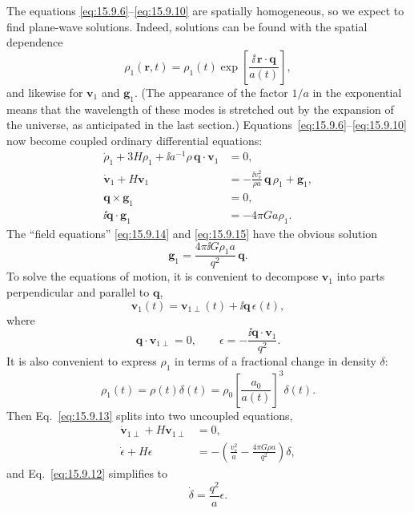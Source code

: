 The equations \eqref{eq:15.9.6}--\eqref{eq:15.9.10} are spatially
homogeneous, so we expect to find plane-wave solutions. Indeed, solutions can
be found with the spatial dependence
\begin{equation}
  \rho_1(\mathbf r,t)
  =
  \rho_1(t)
  \exp\left[
    \frac{\ii\,\mathbf r\cdot\mathbf q}{a(t)}
  \right],
  \tag{15.9.11}\label{eq:15.9.11}
\end{equation}
and likewise for \(\mathbf v_1\) and \(\mathbf g_1\). (The appearance of
the factor \(1/a\) in the exponential means that the wavelength of these
modes is stretched out by the expansion of the universe, as anticipated in
the last section.) Equations~\eqref{eq:15.9.6}--\eqref{eq:15.9.10} now
become coupled ordinary differential equations:
\begin{align}
  \dot\rho_1+3H\rho_1
  +\ii a^{-1}\rho\,\mathbf q\cdot\mathbf v_1
  &=0,
  \tag{15.9.12}\label{eq:15.9.12}\\
  \dot{\mathbf v}_1+H\mathbf v_1
  &=
  -\frac{\ii v_s^2}{\rho a}\,\mathbf q\,\rho_1+\mathbf g_1,
  \tag{15.9.13}\label{eq:15.9.13}\\
  \mathbf q\times\mathbf g_1
  &=0,
  \tag{15.9.14}\label{eq:15.9.14}\\
  \ii\mathbf q\cdot\mathbf g_1
  &=-4\pi G a\rho_1.
  \tag{15.9.15}\label{eq:15.9.15}
\end{align}
The ``field equations'' \eqref{eq:15.9.14} and \eqref{eq:15.9.15} have
the obvious solution
\begin{equation}
  \mathbf g_1
  =
  \frac{4\pi\ii G\rho_1a}{q^2}\,\mathbf q.
  \tag{15.9.16}\label{eq:15.9.16}
\end{equation}
To solve the equations of motion, it is convenient to decompose
\(\mathbf v_1\) into parts perpendicular and parallel to \(\mathbf q\),
\begin{equation}
  \mathbf v_1(t)
  =
  \mathbf v_{1\perp}(t)+\ii\mathbf q\,\epsilon(t),
  \tag{15.9.17}\label{eq:15.9.17}
\end{equation}
where
\[
  \mathbf q\cdot\mathbf v_{1\perp}=0,
  \qquad
  \epsilon=-\frac{\ii\mathbf q\cdot\mathbf v_1}{q^2}.
\]
It is also convenient to express \(\rho_1\) in terms of a fractional change
in density \(\delta\):
\begin{equation}
  \rho_1(t)
  =
  \rho(t)\delta(t)
  =
  \rho_0\left[\frac{a_0}{a(t)}\right]^3\delta(t).
  \tag{15.9.18}\label{eq:15.9.18}
\end{equation}
Then Eq.~\eqref{eq:15.9.13} splits into two uncoupled equations,
\begin{align}
  \dot{\mathbf v}_{1\perp}+H\mathbf v_{1\perp}
  &=0,
  \tag{15.9.19}\label{eq:15.9.19}\\
  \dot\epsilon+H\epsilon
  &=
  -\left(
    \frac{v_s^2}{a}
    -\frac{4\pi G\rho a}{q^2}
  \right)\delta,
  \tag{15.9.20}\label{eq:15.9.20}
\end{align}
and Eq.~\eqref{eq:15.9.12} simplifies to
\begin{equation}
  \dot\delta=\frac{q^2}{a}\epsilon.
  \tag{15.9.21}\label{eq:15.9.21}
\end{equation}

